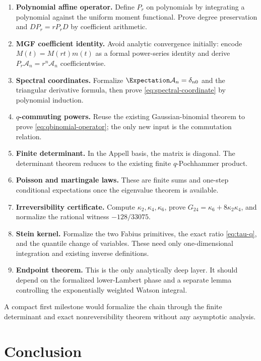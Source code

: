 \documentclass[11pt,a4paper]{article}
\theoremstyle{definition}
\theoremstyle{remark}
\newcommand{\Acal}{\mathcal A}
\begin{document}
\begin{enumerate}
\item \textbf{Polynomial affine operator.} Define $P_r$ on polynomials by integrating a polynomial against the uniform moment functional. Prove degree preservation and $DP_r=rP_rD$ by coefficient arithmetic.
\item \textbf{MGF coefficient identity.} Avoid analytic convergence initially: encode $M(t)=M(rt)m(t)$ as a formal power-series identity and derive $P_r\Acal_n=r^n\Acal_n$ coefficientwise.
\item \textbf{Spectral coordinates.} Formalize $\Expectation\Acal_n=\delta_{n0}$ and the triangular derivative formula, then prove \eqref{eq:spectral-coordinate} by polynomial induction.
\item \textbf{$q$-commuting powers.} Reuse the existing Gaussian-binomial theorem to prove \eqref{eq:qbinomial-operator}; the only new input is the commutation relation.
\item \textbf{Finite determinant.} In the Appell basis, the matrix is diagonal. The determinant theorem reduces to the existing finite $q$-Pochhammer product.
\item \textbf{Poisson and martingale laws.} These are finite sums and one-step conditional expectations once the eigenvalue theorem is available.
\item \textbf{Irreversibility certificate.} Compute $\kappa_2,\kappa_4,\kappa_6$, prove $G_{24}=\kappa_6+8\kappa_2\kappa_4$, and normalize the rational witness $-128/33075$.
\item \textbf{Stein kernel.} Formalize the two Fabius primitives, the exact ratio \eqref{eq:tau-q}, and the quantile change of variables. These need only one-dimensional integration and existing inverse definitions.
\item \textbf{Endpoint theorem.} This is the only analytically deep layer. It should depend on the formalized lower-Lambert phase and a separate lemma controlling the exponentially weighted Watson integral.
\end{enumerate}

A compact first milestone would formalize the chain through the finite determinant and exact nonreversibility theorem without any asymptotic analysis.

\section{Conclusion}
\label{sec:conclusion}
\end{document}
